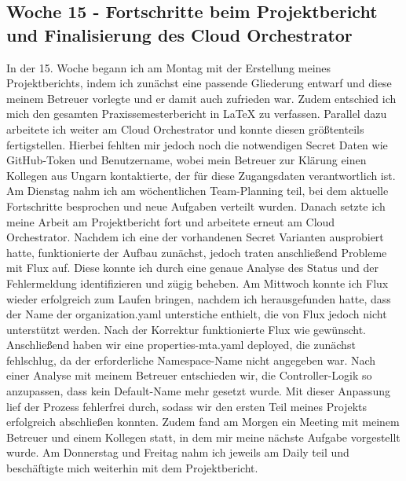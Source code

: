 \subsection{Woche 15 - Fortschritte beim Projektbericht und Finalisierung des Cloud Orchestrator}
In der 15. Woche begann ich am Montag mit der Erstellung meines Projektberichts, indem ich zunächst eine passende Gliederung
entwarf und diese meinem Betreuer vorlegte und er damit auch zufrieden war.
Zudem entschied ich mich den gesamten Praxissemesterbericht in LaTeX zu verfassen.
Parallel dazu arbeitete ich weiter am Cloud Orchestrator und konnte diesen größtenteils fertigstellen.
Hierbei fehlten mir jedoch noch die notwendigen Secret Daten wie GitHub-Token und Benutzername, wobei mein Betreuer zur
Klärung einen Kollegen aus Ungarn kontaktierte, der für diese Zugangsdaten verantwortlich ist.
Am Dienstag nahm ich am wöchentlichen Team-Planning teil, bei dem aktuelle Fortschritte besprochen und neue Aufgaben verteilt
wurden.
Danach setzte ich meine Arbeit am Projektbericht fort und arbeitete erneut am Cloud Orchestrator.
Nachdem ich eine der vorhandenen Secret Varianten ausprobiert hatte, funktionierte der Aufbau zunächst, jedoch traten
anschließend Probleme mit Flux auf.
Diese konnte ich durch eine genaue Analyse des Status und der Fehlermeldung identifizieren und zügig beheben.
Am Mittwoch konnte ich Flux wieder erfolgreich zum Laufen bringen, nachdem ich herausgefunden hatte, dass der Name der
organization.yaml unterstiche enthielt, die von Flux jedoch nicht unterstützt werden.
Nach der Korrektur funktionierte Flux wie gewünscht.
Anschließend   haben wir eine properties-mta.yaml deployed, die zunächst fehlschlug, da der erforderliche Namespace-Name
nicht angegeben war.
Nach einer Analyse mit meinem Betreuer entschieden wir, die Controller-Logik so anzupassen, dass kein Default-Name mehr
gesetzt wurde.
Mit dieser Anpassung lief der Prozess fehlerfrei durch, sodass wir den ersten Teil meines Projekts erfolgreich abschließen konnten.
Zudem fand am Morgen ein Meeting mit meinem Betreuer und einem Kollegen statt, in dem mir meine nächste Aufgabe vorgestellt wurde.
Am Donnerstag und Freitag nahm ich jeweils am Daily teil und beschäftigte mich weiterhin mit dem Projektbericht.